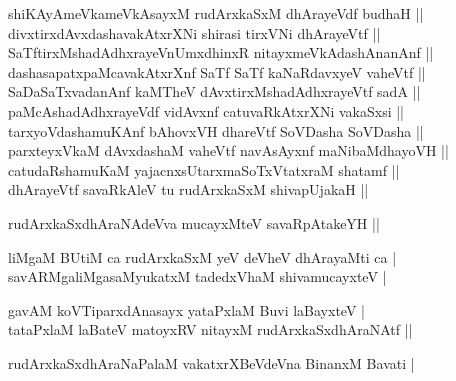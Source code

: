 \begin{entry}
\begin{shl}
shiKAyAmeVkameVkAsayxM rudArxkaSxM dhArayeVdf budhaH ||\\
divxtirxdAvxdashavakAtxrXNi shirasi tirxVNi dhArayeVtf ||\\
SaTftirxMshadAdhxrayeVnUmxdhinxR nitayxmeVkAdashAnanAnf ||\\
dashasapatxpaMcavakAtxrXnf SaTf SaTf kaNaRdavxyeV vaheVtf ||\\
SaDaSaTxvadanAnf kaMTheV dAvxtirxMshadAdhxrayeVtf sadA ||\\
paMcAshadAdhxrayeVdf vidAvxnf catuvaRkAtxrXNi vakaSxsi ||\\
tarxyoVdashamuKAnf bAhovxVH dhareVtf SoVDasha SoVDasha ||\\
parxteyxVkaM dAvxdashaM vaheVtf navAsAyxnf maNibaMdhayoVH ||\\
catudaRshamuKaM yajacnxsUtarxmaSoTxVtatxraM shatamf ||\\
dhArayeVtf savaRkAleV tu rudArxkaSxM shivapUjakaH ||
\end{shl}
\begin{shl}
rudArxkaSxdhAraNAdeVva mucayxMteV savaRpAtakeYH ||
\end{shl}
\begin{shl}
liMgaM BUtiM ca rudArxkaSxM yeV deVheV dhArayaMti ca |\\
savARMgaliMgasaMyukatxM tadedxVhaM shivamucayxteV |
\end{shl}

\end{entry}

\begin{entry}
\begin{shl}
gavAM koVTiparxdAnasayx yataPxlaM Buvi laBayxteV |\\
tataPxlaM laBateV matoyxRV nitayxM rudArxkaSxdhAraNAtf ||
\end{shl}
\begin{shl}
rudArxkaSxdhAraNaPalaM vakatxrXBeVdeVna BinanxM Bavati |
\end{shl}
\end{entry}

